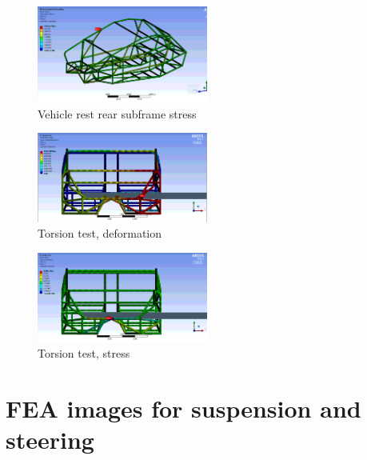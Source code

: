 \documentclass[10pt]{article}
\begin{document}
\begin{figure}[H]
\centering
\includegraphics[width=0.5\textwidth]{figures/fea/chassis/chassis-rear-suspension-stress}
\caption{Vehicle rest rear subframe stress}
\label{sec:chassis-rear-suspension-stress}
\end{figure}

\begin{figure}[H]
\centering
\includegraphics[width=0.5\textwidth]{figures/fea/chassis/torsion-deformation}
\caption{Torsion test, deformation}
\label{sec:torsion-deformation}
\end{figure}

\begin{figure}[H]
\centering
\includegraphics[width=0.5\textwidth]{figures/fea/chassis/torsion-stress}
\caption{Torsion test, stress}
\label{sec:torsion-stress}
\end{figure}

\clearpage
\section{FEA images for suspension and steering}
\label{sec:fea-parts-images}
\end{document}
